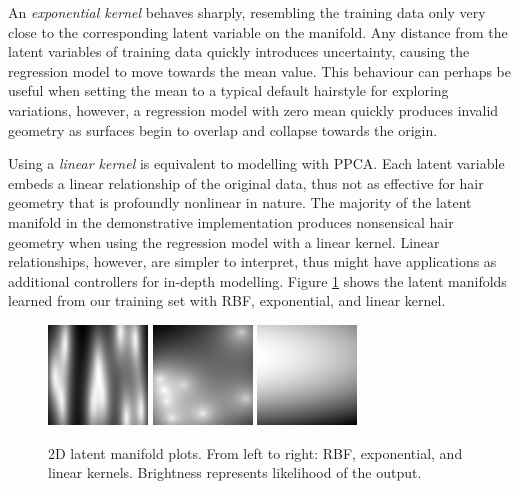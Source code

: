 \documentclass[ %
author={Dillon Keith Diep},
supervisor={Dr. Carl Henrik Ek},
degree={MEng},
title={ART-CG Hair:},
subtitle={Assisted Real-time Content Generation of Stylised Virtual Hair},
type={Research},
year={2017} ]{dissertation}
\begin{document}
	An \textit{exponential kernel} behaves sharply, resembling the training data only very close to the corresponding latent variable on the manifold. Any distance from the latent variables of training data quickly introduces uncertainty, causing the regression model to move towards the mean value. This behaviour can perhaps be useful when setting the mean to a typical default hairstyle for exploring variations, however, a regression model with zero mean quickly produces invalid geometry as surfaces begin to overlap and collapse towards the origin.
	
	Using a \textit{linear kernel} is equivalent to modelling with PPCA. Each latent variable embeds a linear relationship of the original data, thus not as effective for hair geometry that is profoundly nonlinear in nature. The majority of the latent manifold in the demonstrative implementation produces nonsensical hair geometry when using the regression model with a linear kernel. Linear relationships, however, are simpler to interpret, thus might have applications as additional controllers for in-depth modelling. Figure \ref{fig:manifold} shows the latent manifolds learned from our training set with RBF, exponential, and linear kernel.
	
	\begin{figure}[!h]
		\centering
		\caption{2D latent manifold plots. From left to right: RBF, exponential, and linear kernels. Brightness represents likelihood of the output.}
		\includegraphics[scale=1]{images/latentPlot_t10}
		\includegraphics[scale=1]{images/latentPlot_exp}
		\includegraphics[scale=1]{images/latentPlot_linear}
		\label{fig:manifold}
	\end{figure}
	
\end{document}
